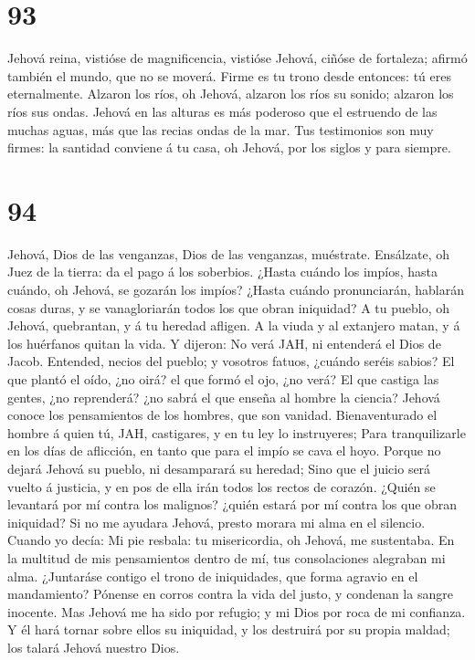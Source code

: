 \hypertarget{section-92}{%
\section{93}\label{section-92}}

 Jehová reina, vistióse de magnificencia, vistióse Jehová,
ciñóse de fortaleza; afirmó también el mundo, que no se moverá.
 Firme es tu trono desde entonces: tú eres eternalmente.
 Alzaron los ríos, oh Jehová, alzaron los ríos su sonido;
alzaron los ríos sus ondas.  Jehová en las alturas es más
poderoso que el estruendo de las muchas aguas, más que las recias ondas
de la mar.  Tus testimonios son muy firmes: la santidad
conviene á tu casa, oh Jehová, por los siglos y para siempre.

\hypertarget{section-93}{%
\section{94}\label{section-93}}

 Jehová, Dios de las venganzas, Dios de las venganzas,
muéstrate.  Ensálzate, oh Juez de la tierra: da el pago á
los soberbios.  ¿Hasta cuándo los impíos, hasta cuándo, oh
Jehová, se gozarán los impíos?  ¿Hasta cuándo pronunciarán,
hablarán cosas duras, y se vanagloriarán todos los que obran iniquidad?
 A tu pueblo, oh Jehová, quebrantan, y á tu heredad afligen.
 A la viuda y al extanjero matan, y á los huérfanos quitan
la vida.  Y dijeron: No verá JAH, ni entenderá el Dios de
Jacob.  Entended, necios del pueblo; y vosotros fatuos,
¿cuándo seréis sabios?  El que plantó el oído, ¿no oirá? el
que formó el ojo, ¿no verá?  El que castiga las gentes, ¿no
reprenderá? ¿no sabrá el que enseña al hombre la ciencia? 
Jehová conoce los pensamientos de los hombres, que son vanidad.
 Bienaventurado el hombre á quien tú, JAH, castigares, y en
tu ley lo instruyeres;  Para tranquilizarle en los días de
aflicción, en tanto que para el impío se cava el hoyo. 
Porque no dejará Jehová su pueblo, ni desamparará su heredad;
 Sino que el juicio será vuelto á justicia, y en pos de
ella irán todos los rectos de corazón.  ¿Quién se levantará
por mí contra los malignos? ¿quién estará por mí contra los que obran
iniquidad?  Si no me ayudara Jehová, presto morara mi alma
en el silencio.  Cuando yo decía: Mi pie resbala: tu
misericordia, oh Jehová, me sustentaba.  En la multitud de
mis pensamientos dentro de mí, tus consolaciones alegraban mi alma.
 ¿Juntaráse contigo el trono de iniquidades, que forma
agravio en el mandamiento?  Pónense en corros contra la
vida del justo, y condenan la sangre inocente.  Mas Jehová
me ha sido por refugio; y mi Dios por roca de mi confianza.
 Y él hará tornar sobre ellos su iniquidad, y los destruirá
por su propia maldad; los talará Jehová nuestro Dios.

